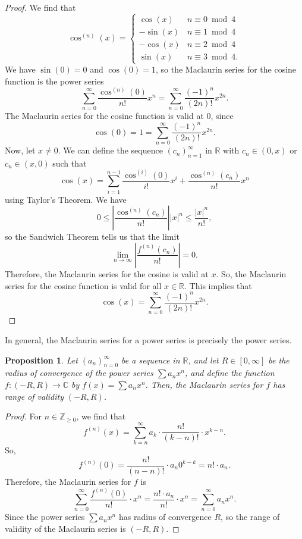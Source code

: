 \documentclass[a4paper, openany]{memoir}
\theoremstyle{definition}
\theoremstyle{plain}
\newtheorem{proposition}[definition]{Proposition}
\begin{document}
\begin{proof}
We find that
\[\cos^{(n)}(x) = \begin{cases}
\cos (x) & n \equiv 0 \bmod{4} \\
-\sin (x) & n \equiv 1 \bmod{4} \\
-\cos (x) & n \equiv 2 \bmod{4} \\
\sin (x) & n \equiv 3 \bmod{4}.
\end{cases}\]
We have $\sin (0) = 0$ and $\cos (0) = 1$, so the Maclaurin series for the cosine function is the power series
\[\sum_{n=0}^{\infty} \frac{\cos^{(n)}(0)}{n!} x^n = \sum_{n=0}^{\infty} \frac{(-1)^n}{(2n)!} x^{2n}.\]
The Maclaurin series for the cosine function is valid at 0, since
\[\cos (0) = 1 = \sum_{n=0}^{\infty} \frac{(-1)^n}{(2n)!} x^{2n}.\]
Now, let $x \neq 0$. We can define the sequence $(c_n)_{n=1}^{\infty}$ in $\mathbb{R}$ with $c_n \in (0, x)$ or $c_n \in (x, 0)$ such that
\[\cos(x) = \sum_{i=1}^{n-1} \frac{\cos^{(i)}(0)}{i!} x^i + \frac{\cos^{(n)}(c_n)}{n!} x^n\]
using Taylor's Theorem. We have
\[0 \leqslant \left|\frac{\cos^{(n)}(c_n)}{n!}\right| |x|^n \leqslant \frac{|x|^n}{n!},\]
so the Sandwich Theorem tells us that the limit
\[\lim_{n \to \infty} \left|\frac{f^{(n)}(c_n)}{n!}\right| = 0.\]
Therefore, the Maclaurin series for the cosine is valid at $x$. So, the Maclaurin series for the cosine function is valid for all $x \in \mathbb{R}$. This implies that
\[\cos (x) = \sum_{n=0}^{\infty} \frac{(-1)^n}{(2n)!} x^{2n}.\]
\end{proof}
\noindent In general, the Maclaurin series for a power series is precisely the power series.
\begin{proposition}
Let $(a_n)_{n=0}^{\infty}$ be a sequence in $\mathbb{R}$, and let $R \in [0, \infty]$ be the radius of convergence of the power series $\sum a_n x^n$, and define the function $f: (-R, R) \to \mathbb{C}$ by $f(x) = \sum a_n x^n$. Then, the Maclaurin series for $f$ has range of validity $(-R, R)$.
\end{proposition}
\begin{proof}
For $n \in \mathbb{Z}_{\geqslant 0}$, we find that
\[f^{(n)}(x) = \sum_{k=n}^\infty a_k \cdot \frac{n!}{(k-n)!} \cdot x^{k-n}.\]
So, 
\[f^{(n)}(0) = \frac{n!}{(n-n)!} \cdot a_n 0^{k-k} = n! \cdot a_n.\]
Therefore, the Maclaurin series for $f$ is
\[\sum_{n=0}^{\infty} \frac{f^{(n)}(0)}{n!} \cdot x^n = \frac{n! \cdot a_n}{n!} \cdot x^n = \sum_{n=0}^{\infty} a_n x^n.\]
Since the power series $\sum a_n x^n$ has radius of convergence $R$, so the range of validity of the Maclaurin series is $(-R, R)$.
\end{proof}
\end{document}
